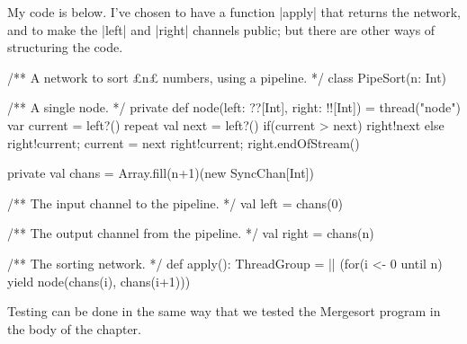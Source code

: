 \begin{answerI}
My code is below.  I've chosen to have a function |apply| that returns the
network, and to make the |left| and |right| channels public; but there are
other ways of structuring the code.
%
\begin{scala}
/** A network to sort £n£ numbers, using a pipeline. */
class PipeSort(n: Int){
  /** A single node. */
  private def node(left: ??[Int], right: !![Int]) = thread("node"){
    var current = left?()
    repeat{
      val next = left?()
      if(current > next) right!next
      else { right!current; current = next }
    }
    right!current; right.endOfStream()
  }

  private val chans = Array.fill(n+1)(new SyncChan[Int])

  /** The input channel to the pipeline. */
  val left = chans(0)

  /** The output channel from the pipeline. */
  val right = chans(n)

  /** The sorting network. */
  def apply(): ThreadGroup =
    || (for(i <- 0 until n) yield node(chans(i), chans(i+1)))
}
\end{scala}

Testing can be done in the same way that we tested the Mergesort program in
the body of the chapter.






\end{answerI}
